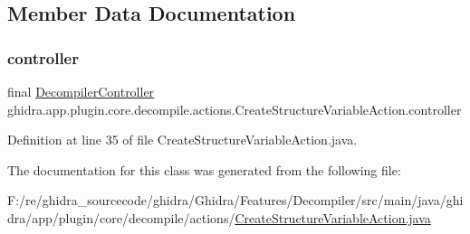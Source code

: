 \subsection{Member Data Documentation}
\mbox{\label{classghidra_1_1app_1_1plugin_1_1core_1_1decompile_1_1actions_1_1_create_structure_variable_action_aa50d3c26a30df166fd5c8a1923ceea56}} 
\subsubsection{\texorpdfstring{controller}{controller}}
{\footnotesize\ttfamily final \mbox{\hyperlink{classghidra_1_1app_1_1decompiler_1_1component_1_1_decompiler_controller}{Decompiler\+Controller}} ghidra.\+app.\+plugin.\+core.\+decompile.\+actions.\+Create\+Structure\+Variable\+Action.\+controller\hspace{0.3cm}{\ttfamily [protected]}}



Definition at line 35 of file Create\+Structure\+Variable\+Action.\+java.



The documentation for this class was generated from the following file\+:\begin{DoxyCompactItemize}
\item 
F\+:/re/ghidra\+\_\+sourcecode/ghidra/\+Ghidra/\+Features/\+Decompiler/src/main/java/ghidra/app/plugin/core/decompile/actions/\mbox{\hyperlink{_create_structure_variable_action_8java}{Create\+Structure\+Variable\+Action.\+java}}\end{DoxyCompactItemize}
